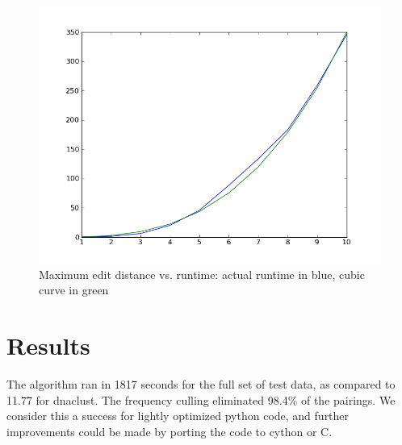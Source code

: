 \documentclass[11pt,letterpaper]{article}
\begin{document}
\begin{figure}
\begin{center}
\includegraphics[scale = 0.5]{its_cubic.png}
\caption{Maximum edit distance vs. runtime: actual runtime in blue, cubic curve in green}
\end{center}
\end{figure}

\section{Results}
The algorithm ran in 1817 seconds for the full set of test data, as compared to 11.77 for dnaclust. The frequency culling eliminated 98.4\% of the pairings. We consider this a success for lightly optimized python code, and further improvements could be made by porting the code to cython or C.  
\maketitle
\end{document}
